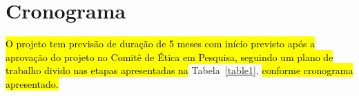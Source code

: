 \documentclass[a4paper,11pt,titlepage,singlespacing]{article}
\begin{document}








\section{Cronograma}
\hl{O projeto tem previsão de duração de 5 meses com início previsto após a aprovação do projeto no Comitê de Ética em Pesquisa, seguindo um plano de trabalho divido nas etapas apresentadas na} Tabela~\ref{table1}, \hl{conforme cronograma apresentado.}
\end{document}
